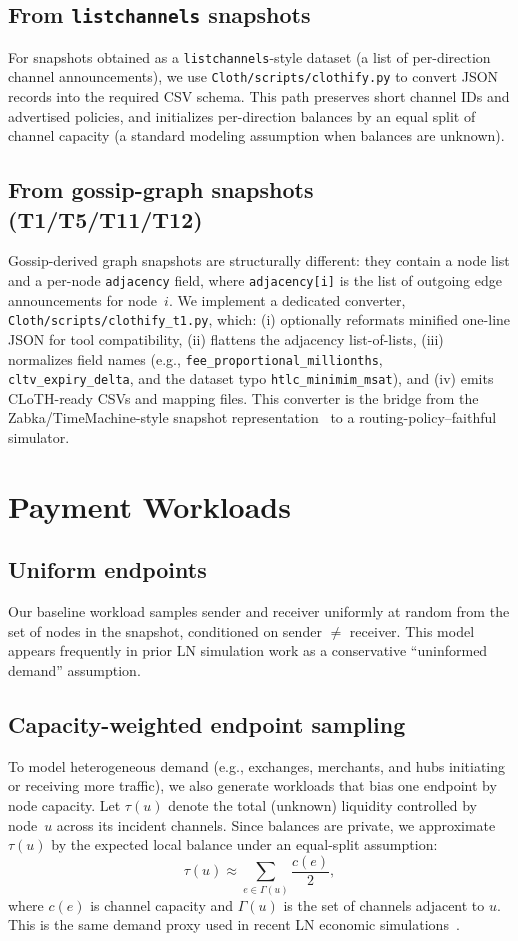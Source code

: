 \documentclass{article}
\begin{document}
\subsection{From \texttt{listchannels} snapshots}
For snapshots obtained as a \texttt{listchannels}-style dataset (a list of per-direction channel announcements), we use \texttt{Cloth/scripts/clothify.py} to convert JSON records into the required CSV schema.
This path preserves short channel IDs and advertised policies, and initializes per-direction balances by an equal split of channel capacity (a standard modeling assumption when balances are unknown).

\subsection{From gossip-graph snapshots (T1/T5/T11/T12)}
Gossip-derived graph snapshots are structurally different: they contain a node list and a per-node \texttt{adjacency} field, where \texttt{adjacency[i]} is the list of outgoing edge announcements for node~$i$.
We implement a dedicated converter, \texttt{Cloth/scripts/clothify\_t1.py}, which:
(i) optionally reformats minified one-line JSON for tool compatibility,
(ii) flattens the adjacency list-of-lists,
(iii) normalizes field names (e.g., \texttt{fee\_proportional\_millionths}, \texttt{cltv\_expiry\_delta}, and the dataset typo \texttt{htlc\_minimim\_msat}),
and (iv) emits CLoTH-ready CSVs and mapping files.
This converter is the bridge from the Zabka/TimeMachine-style snapshot representation~\cite{zabka2024centrality} to a routing-policy--faithful simulator.

\section{Payment Workloads}
\label{sec:payments}

\subsection{Uniform endpoints}
Our baseline workload samples sender and receiver uniformly at random from the set of nodes in the snapshot, conditioned on sender $\neq$ receiver.
This model appears frequently in prior LN simulation work as a conservative ``uninformed demand'' assumption.

\subsection{Capacity-weighted endpoint sampling}
To model heterogeneous demand (e.g., exchanges, merchants, and hubs initiating or receiving more traffic), we also generate workloads that bias one endpoint by node capacity.
Let $\tau(u)$ denote the total (unknown) liquidity controlled by node~$u$ across its incident channels.
Since balances are private, we approximate $\tau(u)$ by the expected local balance under an equal-split assumption:
\[
\tau(u) \approx \sum_{e \in \Gamma(u)} \frac{c(e)}{2},
\]
where $c(e)$ is channel capacity and $\Gamma(u)$ is the set of channels adjacent to $u$.
This is the same demand proxy used in recent LN economic simulations~\cite{carotti2023rational}.
\end{document}
